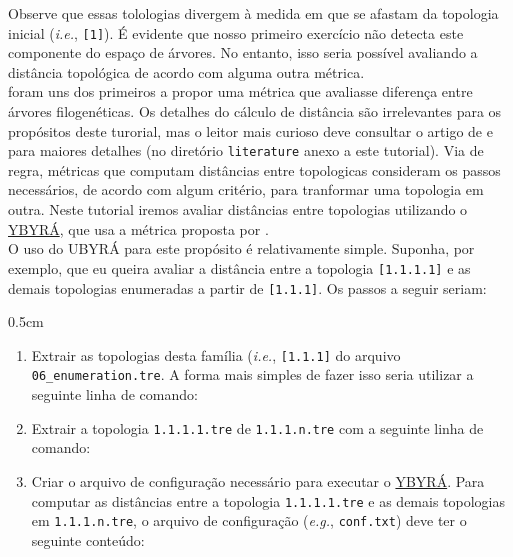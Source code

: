 \begin{refsection}

Observe que essas tolologias divergem à medida em que se afastam da topologia inicial (\textit{i.e.}, \texttt{[1]}). É evidente que nosso primeiro exercício não detecta este componente do espaço de árvores. No entanto, isso seria possível avaliando a distância topológica de acordo com alguma outra métrica.\\

\textcite{Robinson_and_Foulds_1981} foram uns dos primeiros a propor uma métrica que avaliasse diferença entre árvores filogenéticas. Os detalhes do cálculo de distância são irrelevantes para os propósitos deste turorial, mas o leitor mais curioso deve consultar o artigo de \textcite{Robinson_and_Foulds_1981} e \textcite{BogdanowiczETGiaro_2013} para maiores detalhes (no diretório \texttt{literature} anexo a este tutorial). Via de regra, métricas que computam distâncias entre topologicas consideram os passos necessários, de acordo com algum critério, para tranformar uma topologia em outra. Neste tutorial iremos avaliar distâncias entre topologias utilizando o \href{http://www.ib.usp.br/grant/anfibios/researchSoftware.html/}{YBYRÁ}, que usa a métrica proposta por \textcite{Robinson_and_Foulds_1981}.\\

O uso do UBYRÁ para este propósito é relativamente simple. Suponha, por exemplo, que eu queira avaliar a distância entre a topologia \texttt{[1.1.1.1]} e as demais topologias enumeradas a partir de \texttt{[1.1.1]}. Os passos a seguir seriam:

\begin {myindentpar}{0.5cm}
\begin{enumerate}[\itshape i.]
	\item{} Extrair as topologias desta família (\textit{i.e.}, \texttt{[1.1.1]} do arquivo \texttt{06\_enumeration.tre}. A forma mais simples de fazer isso seria utilizar a seguinte linha de comando:

\shellcmd{egrep '\textbackslash[1\textbackslash.1\textbackslash.1\textbackslash..*' 06\_enumeration.tre > 1.1.1.n.tre}

	\item{} Extrair a topologia \texttt{1.1.1.1.tre} de \texttt{1.1.1.n.tre} com a seguinte linha de comando:


	\item{} Criar o arquivo de configuração necessário para executar o \href{http://www.ib.usp.br/grant/anfibios/researchSoftware.html/}{YBYRÁ}. Para computar as distâncias entre a topologia \texttt{1.1.1.1.tre} e as demais topologias em \texttt{1.1.1.n.tre}, o arquivo de configuração (\textit{e.g.}, \texttt{conf.txt}) deve ter o seguinte conteúdo:


\end{enumerate}
\end{myindentpar}
\end{refsection}
